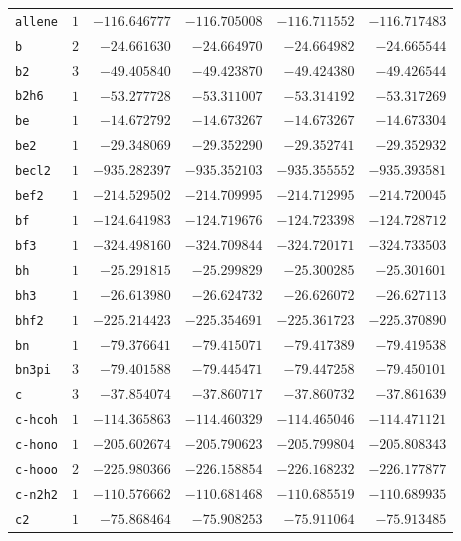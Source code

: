 {\begin{longtable}{@{}lrrrrr@{}}
    \texttt{allene} & $1$ & $-116.646777$ & $-116.705008$ & $-116.711552$ & $-116.717483$ \\
    \texttt{b} & $2$ & $-24.661630$ & $-24.664970$ & $-24.664982$ & $-24.665544$ \\
    \texttt{b2} & $3$ & $-49.405840$ & $-49.423870$ & $-49.424380$ & $-49.426544$ \\
    \texttt{b2h6} & $1$ & $-53.277728$ & $-53.311007$ & $-53.314192$ & $-53.317269$ \\
    \texttt{be} & $1$ & $-14.672792$ & $-14.673267$ & $-14.673267$ & $-14.673304$ \\
    \texttt{be2} & $1$ & $-29.348069$ & $-29.352290$ & $-29.352741$ & $-29.352932$ \\
    \texttt{becl2} & $1$ & $-935.282397$ & $-935.352103$ & $-935.355552$ & $-935.393581$ \\
    \texttt{bef2} & $1$ & $-214.529502$ & $-214.709995$ & $-214.712995$ & $-214.720045$ \\
    \texttt{bf} & $1$ & $-124.641983$ & $-124.719676$ & $-124.723398$ & $-124.728712$ \\
    \texttt{bf3} & $1$ & $-324.498160$ & $-324.709844$ & $-324.720171$ & $-324.733503$ \\
    \texttt{bh} & $1$ & $-25.291815$ & $-25.299829$ & $-25.300285$ & $-25.301601$ \\
    \texttt{bh3} & $1$ & $-26.613980$ & $-26.624732$ & $-26.626072$ & $-26.627113$ \\
    \texttt{bhf2} & $1$ & $-225.214423$ & $-225.354691$ & $-225.361723$ & $-225.370890$ \\
    \texttt{bn} & $1$ & $-79.376641$ & $-79.415071$ & $-79.417389$ & $-79.419538$ \\
    \texttt{bn3pi} & $3$ & $-79.401588$ & $-79.445471$ & $-79.447258$ & $-79.450101$ \\
    \texttt{c} & $3$ & $-37.854074$ & $-37.860717$ & $-37.860732$ & $-37.861639$ \\
    \texttt{c-hcoh} & $1$ & $-114.365863$ & $-114.460329$ & $-114.465046$ & $-114.471121$ \\
    \texttt{c-hono} & $1$ & $-205.602674$ & $-205.790623$ & $-205.799804$ & $-205.808343$ \\
    \texttt{c-hooo} & $2$ & $-225.980366$ & $-226.158854$ & $-226.168232$ & $-226.177877$ \\
    \texttt{c-n2h2} & $1$ & $-110.576662$ & $-110.681468$ & $-110.685519$ & $-110.689935$ \\
    \texttt{c2} & $1$ & $-75.868464$ & $-75.908253$ & $-75.911064$ & $-75.913485$ \\

\end{longtable}}
